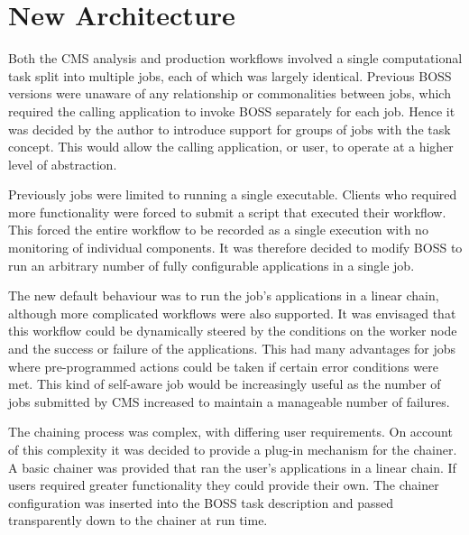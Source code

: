
\section{New Architecture}
Both the CMS analysis and production workflows involved a single computational task split into multiple jobs, each of which was largely identical. Previous BOSS versions were unaware of any relationship or commonalities between jobs, which required the calling application to invoke BOSS separately for each job. Hence it was decided by the author to introduce support for groups of jobs with the task concept. This would allow the calling application, or user, to operate at a higher level of abstraction.
 

Previously jobs were limited to running a single executable. Clients who required more functionality were forced to submit a script that executed their workflow. This forced the entire workflow to be recorded as a single execution with no monitoring of individual components. It was therefore decided to modify BOSS to run an arbitrary number of fully configurable applications in a single job. 

The new default behaviour was to run the job's applications in a linear chain, although more complicated workflows were also supported. It was envisaged that this workflow could be dynamically steered by the conditions on the worker node and the success or failure of the applications. This had many advantages for jobs where pre-programmed actions could be taken if certain error conditions were met. This kind of self-aware job would be increasingly useful as the number of jobs submitted by CMS increased to maintain a manageable number of failures. 

The chaining process was complex, with differing user requirements. On account of this complexity it was decided to provide a plug-in mechanism for the chainer. A basic chainer was provided that ran the user's applications in a linear chain. If users required greater functionality they could provide their own. The chainer configuration was inserted into the BOSS task description and passed transparently down to the chainer at run time. 

